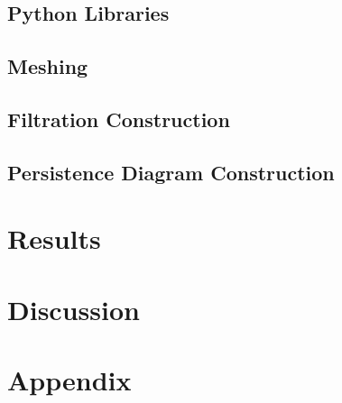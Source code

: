 \documentclass[ma]{uncgdissertationexp2}
\theoremstyle{plain}
\theoremstyle{definition}
\theoremstyle{remark}
\begin{document}
\section{Python Libraries}

\section{Meshing}

\section{Filtration Construction}

\section{Persistence Diagram Construction}

\chapter{Results}

\chapter{Discussion}






\appendix
\chapter{Appendix}

\backmatter
\end{document}
